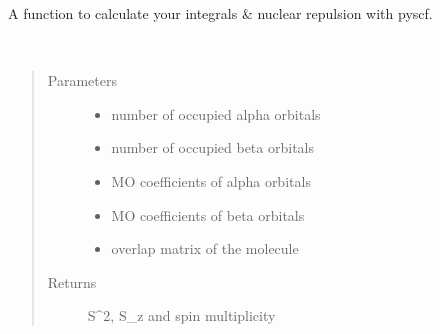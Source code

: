 \documentclass[letterpaper,10pt,english]{sphinxmanual}
\begin{document}

\begin{fulllineitems}
\label{\detokenize{SCF_functions:ghf.SCF_functions.get_integrals}}
A function to calculate your integrals \& nuclear repulsion with pyscf.

\end{fulllineitems}


\begin{fulllineitems}
\label{\detokenize{SCF_functions:ghf.SCF_functions.spin}}~\begin{quote}\begin{description}
\item[{Parameters}] \leavevmode\begin{itemize}
\item {} 
 \textendash{} number of occupied alpha orbitals

\item {} 
 \textendash{} number of occupied beta orbitals

\item {} 
 \textendash{} MO coefficients of alpha orbitals

\item {} 
 \textendash{} MO coefficients of beta orbitals

\item {} 
 \textendash{} overlap matrix of the molecule

\end{itemize}

\item[{Returns}] \leavevmode
S\textasciicircum{}2, S\_z and spin multiplicity

\end{description}\end{quote}

\end{fulllineitems}
\end{document}
